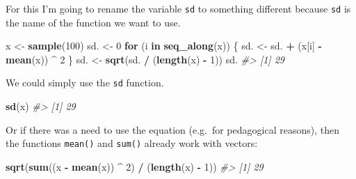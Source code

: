 \documentclass[]{book}
\newenvironment{Shaded}{\begin{snugshade}}{\end{snugshade}}
\newcommand{\CommentTok}[1]{\textcolor[rgb]{0.56,0.35,0.01}{\textit{#1}}}
\newcommand{\ControlFlowTok}[1]{\textcolor[rgb]{0.13,0.29,0.53}{\textbf{#1}}}
\newcommand{\DecValTok}[1]{\textcolor[rgb]{0.00,0.00,0.81}{#1}}
\newcommand{\KeywordTok}[1]{\textcolor[rgb]{0.13,0.29,0.53}{\textbf{#1}}}
\newcommand{\NormalTok}[1]{#1}
\newcommand{\OperatorTok}[1]{\textcolor[rgb]{0.81,0.36,0.00}{\textbf{#1}}}
\newcommand{\StringTok}[1]{\textcolor[rgb]{0.31,0.60,0.02}{#1}}
\theoremstyle{plain}
\theoremstyle{remark}
\begin{document}
For this I'm going to rename the variable \texttt{sd} to something different because \texttt{sd} is the name of the function we want to use.

\begin{Shaded}
\begin{Highlighting}[]
\NormalTok{x <-}\StringTok{ }\KeywordTok{sample}\NormalTok{(}\DecValTok{100}\NormalTok{)}
\NormalTok{sd. <-}\StringTok{ }\DecValTok{0}
\ControlFlowTok{for}\NormalTok{ (i }\ControlFlowTok{in} \KeywordTok{seq_along}\NormalTok{(x)) \{}
\NormalTok{  sd. <-}\StringTok{ }\NormalTok{sd. }\OperatorTok{+}\StringTok{ }\NormalTok{(x[i] }\OperatorTok{-}\StringTok{ }\KeywordTok{mean}\NormalTok{(x)) }\OperatorTok{^}\StringTok{ }\DecValTok{2}
\NormalTok{\}}
\NormalTok{sd. <-}\StringTok{ }\KeywordTok{sqrt}\NormalTok{(sd. }\OperatorTok{/}\StringTok{ }\NormalTok{(}\KeywordTok{length}\NormalTok{(x) }\OperatorTok{-}\StringTok{ }\DecValTok{1}\NormalTok{))}
\NormalTok{sd.}
\CommentTok{#> [1] 29}
\end{Highlighting}
\end{Shaded}

We could simply use the \texttt{sd} function.

\begin{Shaded}
\begin{Highlighting}[]
\KeywordTok{sd}\NormalTok{(x)}
\CommentTok{#> [1] 29}
\end{Highlighting}
\end{Shaded}

Or if there was a need to use the equation (e.g.~for pedagogical reasons), then
the functions \texttt{mean()} and \texttt{sum()} already work with vectors:

\begin{Shaded}
\begin{Highlighting}[]
\KeywordTok{sqrt}\NormalTok{(}\KeywordTok{sum}\NormalTok{((x }\OperatorTok{-}\StringTok{ }\KeywordTok{mean}\NormalTok{(x)) }\OperatorTok{^}\StringTok{ }\DecValTok{2}\NormalTok{) }\OperatorTok{/}\StringTok{ }\NormalTok{(}\KeywordTok{length}\NormalTok{(x) }\OperatorTok{-}\StringTok{ }\DecValTok{1}\NormalTok{))}
\CommentTok{#> [1] 29}
\end{Highlighting}
\end{Shaded}
\end{document}
